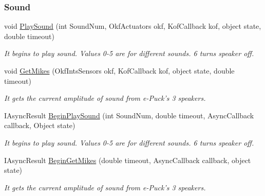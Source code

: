 \subsubsection*{Sound} %
\label{ssub:Sound}
  \begin{DoxyCompactItemize}

  \item void \hyperlink{class_elib_1_1_epuck_a74acd305895e4f07920c45f8b29a8157}{PlaySound} (int SoundNum, OkfActuators okf, KofCallback kof, object state, double timeout)
  \begin{DoxyCompactList}\small\item\em It begins to play sound. Values 0-\/5 are for different sounds. 6 turns speaker off. \item\end{DoxyCompactList}

  \item void \hyperlink{class_elib_1_1_epuck_a176a4a63393394a409220699635a9196}{GetMikes} (OkfIntsSensors okf, KofCallback kof, object state, double timeout)
  \begin{DoxyCompactList}\small\item\em It gets the current amplitude of sound from e-\/Puck's 3 speakers. \item\end{DoxyCompactList}

  \item   IAsyncResult \hyperlink{class_elib_1_1_epuck_a2426a9ea921c131b8349204f477121f5}{BeginPlaySound} (int SoundNum, double timeout, AsyncCallback callback, Object state)
  \begin{DoxyCompactList}\small\item\em It begins to play sound. Values 0-\/5 are for different sounds. 6 turns speaker off. \item\end{DoxyCompactList}

  \item  IAsyncResult \hyperlink{class_elib_1_1_epuck_af69a96d43cc6d5c47960061312d1937b}{BeginGetMikes} (double timeout, AsyncCallback callback, object state)
  \begin{DoxyCompactList}\small\item\em It gets the current amplitude of sound from e-\/Puck's 3 speakers. \item\end{DoxyCompactList}

  \end{DoxyCompactItemize}


